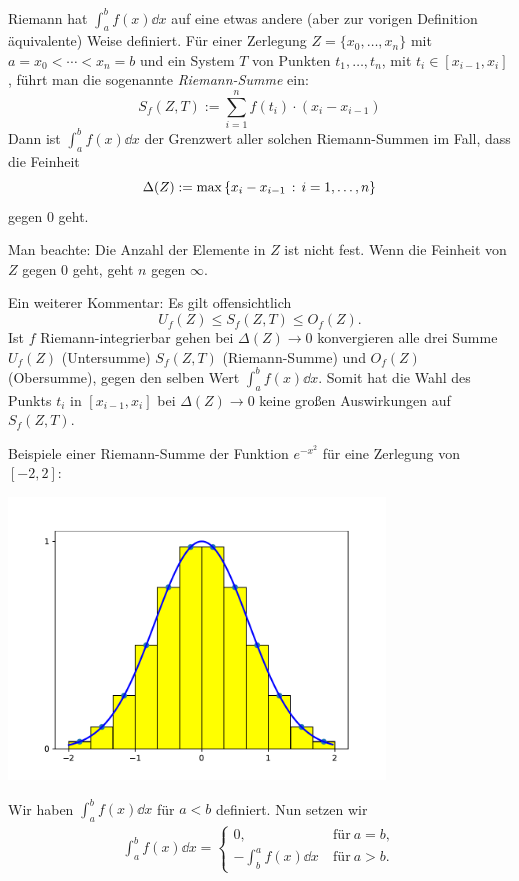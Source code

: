 \begin{bem}
	Riemann hat $\int_a^b f(x) \dd x$ auf eine etwas andere (aber zur vorigen Definition äquivalente) Weise definiert. 
	Für einer Zerlegung $Z = \{x_0,\ldots, x_n\}$ mit $a=x_0 < \cdots < x_n = b$ und ein System $T$ von Punkten  $t_1,\ldots,t_n$, mit $t_i \in [x_{i-1},x_i]$, führt man die sogenannte \emph{Riemann-Summe} ein:
	\[
		S_f(Z,T) := \sum_{i=1}^n  f(t_i) \cdot (x_i - x_{i-1})
	\]
	Dann ist $\int_a^b f(x) \dd x$ der Grenzwert aller solchen Riemann-Summen im Fall, dass die Feinheit 
	\[	
		\Delta(Z):= \max \left\{  x_i-x_{i-1} \,:\,  i = 1,\ldots,n \right\}
	\]
	gegen $0$ geht. 
	
	Man beachte: Die Anzahl der Elemente in $Z$ ist nicht fest. Wenn die Feinheit von $Z$ gegen $0$ geht, geht $n$ gegen $\infty$. 
	
	Ein weiterer Kommentar: Es gilt offensichtlich
	\[
		U_f(Z) \le S_f(Z,T) \le O_f(Z).
	\]
	Ist $f$ Riemann-integrierbar gehen bei $\Delta(Z) \to 0$ konvergieren alle drei Summe $U_f(Z)$ (Untersumme) $S_f(Z,T)$ (Riemann-Summe) und $O_f(Z)$ (Obersumme), gegen den selben Wert $\int_a^b f(x) \dd x$. Somit hat die Wahl des Punkts $t_i$ in $[x_{i-1},x_i]$ bei $\Delta(Z) \to 0$ keine großen Auswirkungen auf $S_f(Z,T)$. 
\end{bem} 

\begin{bem}
	Beispiele einer Riemann-Summe der Funktion $e^{-x^2}$ für eine Zerlegung von $[-2,2]$: 
\begin{center} 
	\includegraphics[width=10cm]{pics/riemann_sum.pdf}
\end{center} 
\end{bem} 

\begin{defn} 
	Wir haben $\int_a^b f(x) \dd x$ für $a<b$ definiert. Nun setzen wir
	\begin{align*}
		\int_a^b f(x) \dd x = \begin{cases}
			0, &  \ \text{für} \ a =b, 
			\\ - \int_b^a f(x) \dd x  & \ \text{für} \ a > b.
		\end{cases} 
	\end{align*} 
\end{defn} 

